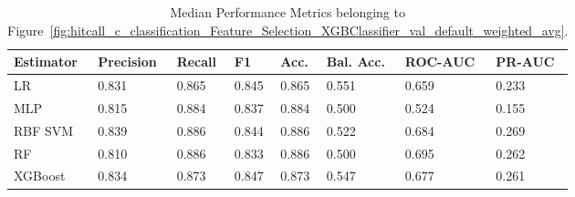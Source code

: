 \begin{longtable}{llllllll}
\caption{Median Performance Metrics belonging to Figure~\ref{fig:hitcall_c_classification_Feature_Selection_XGBClassifier_val_default_weighted_avg}.}\label{tab:table:hitcall_c_classification_feature_selection_xgbclassifier_val_default_weighted_avg}\\
\toprule
\midrule
\small Estimator & \small Precision & \small Recall & \small F1 & \small Acc. & \small Bal. Acc. & \small ROC-AUC & \small PR-AUC\\
\hline
LR & 0.831 & 0.865 & 0.845 & 0.865 & 0.551 & 0.659 & 0.233\\
MLP & 0.815 & 0.884 & 0.837 & 0.884 & 0.500 & 0.524 & 0.155\\
RBF SVM & 0.839 & 0.886 & 0.844 & 0.886 & 0.522 & 0.684 & 0.269\\
RF & 0.810 & 0.886 & 0.833 & 0.886 & 0.500 & 0.695 & 0.262\\
XGBoost & 0.834 & 0.873 & 0.847 & 0.873 & 0.547 & 0.677 & 0.261\\
\bottomrule
\end{longtable}